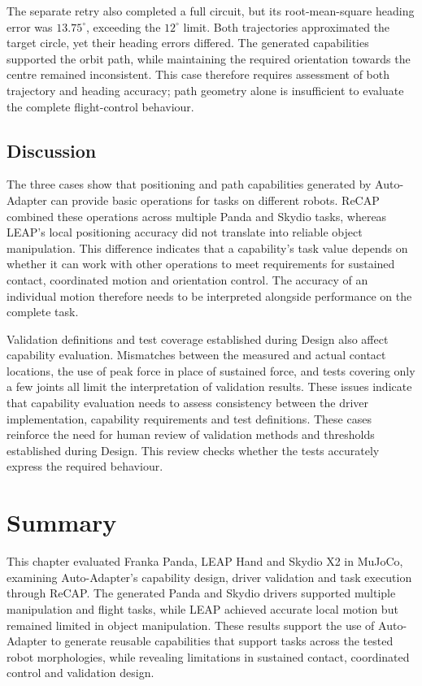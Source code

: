 The separate retry also completed a full circuit, but its root-mean-square
heading error was $13.75^\circ$, exceeding the $12^\circ$ limit.
Both trajectories approximated the target circle, yet their heading errors
differed. The generated capabilities supported the orbit path, while
maintaining the required orientation towards the centre remained
inconsistent. This case therefore requires assessment of both trajectory
and heading accuracy; path geometry alone is insufficient to evaluate
the complete flight-control behaviour.

\subsection{Discussion}
\label{sec:cross-robot-discussion}

The three cases show that positioning and path capabilities generated by
Auto-Adapter can provide basic operations for tasks on different robots.
ReCAP combined these operations across multiple Panda and Skydio tasks,
whereas LEAP's local positioning accuracy did not translate into reliable
object manipulation. This difference indicates that a capability's task
value depends on whether it can work with other operations to meet
requirements for sustained contact, coordinated motion and orientation
control. The accuracy of an individual motion therefore needs to be
interpreted alongside performance on the complete task.

Validation definitions and test coverage established during Design also
affect capability evaluation. Mismatches between the measured and actual
contact locations, the use of peak force in place of sustained force, and
tests covering only a few joints all limit the interpretation of validation
results. These issues indicate that capability evaluation needs to assess
consistency between the driver implementation, capability requirements and
test definitions. These cases reinforce the need for human review of
validation methods and thresholds established during Design. This review
checks whether the tests accurately express the required behaviour.

\section{Summary}
\label{sec:cross-robot-summary}

This chapter evaluated Franka Panda, LEAP Hand and Skydio X2 in MuJoCo,
examining Auto-Adapter's capability design, driver validation and task
execution through ReCAP. The generated Panda and Skydio drivers supported
multiple manipulation and flight tasks, while LEAP achieved accurate local
motion but remained limited in object manipulation. These results support
the use of Auto-Adapter to generate reusable capabilities that support tasks
across the tested robot morphologies, while revealing limitations in
sustained contact, coordinated control and validation design.
